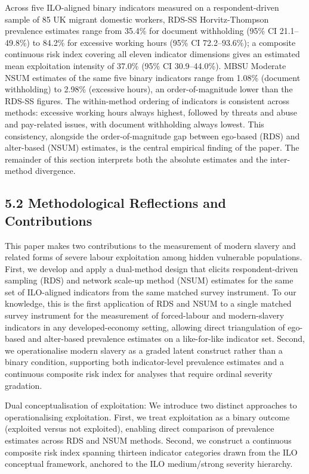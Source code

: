 \documentclass[
  12pt,
  letterpaper,
  DIV=11,
  numbers=noendperiod]{scrartcl}
\begin{document}
Across five ILO-aligned binary indicators measured on a
respondent-driven sample of 85 UK migrant domestic workers, RDS-SS
Horvitz-Thompson prevalence estimates range from 35.4\% for document
withholding (95\% CI 21.1--49.8\%) to 84.2\% for excessive working hours
(95\% CI 72.2--93.6\%); a composite continuous risk index covering all
eleven indicator dimensions gives an estimated mean exploitation
intensity of 37.0\% (95\% CI 30.9--44.0\%). MBSU Moderate NSUM estimates
of the same five binary indicators range from 1.08\% (document
withholding) to 2.98\% (excessive hours), an order-of-magnitude lower
than the RDS-SS figures. The within-method ordering of indicators is
consistent across methods: excessive working hours always highest,
followed by threats and abuse and pay-related issues, with document
withholding always lowest. This consistency, alongside the
order-of-magnitude gap between ego-based (RDS) and alter-based (NSUM)
estimates, is the central empirical finding of the paper. The remainder
of this section interprets both the absolute estimates and the
inter-method divergence.

\subsection{5.2 Methodological Reflections and
Contributions}\label{methodological-reflections-and-contributions}

This paper makes two contributions to the measurement of modern slavery
and related forms of severe labour exploitation among hidden vulnerable
populations. First, we develop and apply a dual-method design that
elicits respondent-driven sampling (RDS) and network scale-up method
(NSUM) estimates for the same set of ILO-aligned indicators from the
same matched survey instrument. To our knowledge, this is the first
application of RDS and NSUM to a single matched survey instrument for
the measurement of forced-labour and modern-slavery indicators in any
developed-economy setting, allowing direct triangulation of ego-based
and alter-based prevalence estimates on a like-for-like indicator set.
Second, we operationalise modern slavery as a graded latent construct
rather than a binary condition, supporting both indicator-level
prevalence estimates and a continuous composite risk index for analyses
that require ordinal severity gradation.

Dual conceptualisation of exploitation: We introduce two distinct
approaches to operationalising exploitation. First, we treat
exploitation as a binary outcome (exploited versus not exploited),
enabling direct comparison of prevalence estimates across RDS and NSUM
methods. Second, we construct a continuous composite risk index spanning
thirteen indicator categories drawn from the ILO conceptual framework,
anchored to the ILO medium/strong severity hierarchy.
\end{document}
